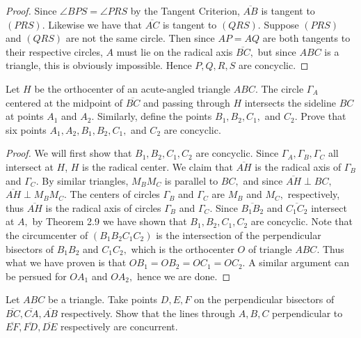 \documentclass[letterpaper,oneside]{scrartcl}
\begin{document}
\begin{proof}  Since $\angle BPS = \angle PRS$ by the Tangent Criterion, $\overline{AB}$ is tangent to $(PRS).$ Likewise we have that $\overline{AC}$ is tangent to $(QRS).$ Suppose $(PRS)$ and $(QRS)$ are not the same circle. Then since $AP=AQ$ are both tangents to their respective circles, $A$ must lie on the radical axis $\overline{BC},$ but since $ABC$ is a triangle, this is obviously impossible. Hence $P,Q,R,S$ are concyclic. \end{proof}



\begin{problem*}
  [2.29, IMO 2008/1]
  Let $H$ be the orthocenter of an acute-angled triangle $ABC.$ The circle $\Gamma_A$ centered at the midpoint of $\overline{BC}$ and passing through $H$ intersects the sideline $BC$ at points $A_1$ and $A_2.$ Similarly, define the points $B_1, B_2, C_1,$ and $C_2.$ Prove that six points $A_1, A_2, B_1, B_2, C_1,$ and $C_2$ are concyclic.
\end{problem*}

\begin{proof}
  We will first show that $B_1, B_2, C_1, C_2$ are concyclic. Since $\Gamma_A,\Gamma_B, \Gamma_C$ all intersect at $H$, $H$ is the radical center. We claim that $\overline{AH}$ is the radical axis of $\Gamma_B$ and $\Gamma_C.$ By similar triangles, $M_BM_C$ is parallel to $BC,$ and since $\overline{AH} \perp BC,$ $\overline{AH} \perp M_BM_C.$ The centers of circles $\Gamma_B$ and $\Gamma_C$ are $M_B$ and $M_C,$ respectively, thus $\overline{AH}$ is the radical axis of circles $\Gamma_B$ and $\Gamma_C.$ Since $\overline{B_1B_2}$ and $\overline{C_1C_2}$ intersect at $A,$ by Theorem 2.9 we have shown that $B_1, B_2,C_1,C_2$ are concyclic. Note that the circumcenter of $(B_1B_2C_1C_2)$ is the intersection of the perpendicular bisectors of $B_1B_2$ and $C_1C_2,$ which is the orthocenter $O$ of triangle $ABC.$ Thus what we have proven is that $OB_1 = OB_2 = OC_1 = OC_2.$ A similar argument can be persued for $OA_1$ and $OA_2,$ hence we are done.
\end{proof}

\begin{problem*}
  [2.30, USAMO 1997/2]
  Let $ABC$ be a triangle. Take points $D, E, F$ on the perpendicular bisectors of $\overline{BC}, \overline{CA}, \overline{AB}$ respectively. Show that the lines through $A, B, C$  perpendicular to $\overline{EF}, \overline{FD}, \overline{DE}$ respectively are concurrent.
\end{problem*}
\end{document}
